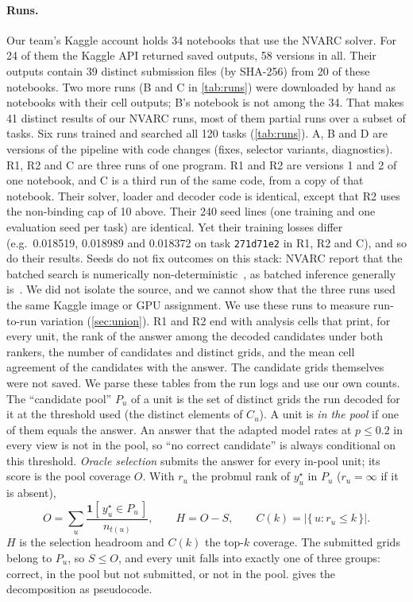 \documentclass[11pt]{article}
\newcommand{\code}[1]{\texttt{#1}}
\newcommand{\R}[1]{R#1}
\begin{document}
\paragraph{Runs.}
Our team's Kaggle account holds 34 notebooks that use the NVARC solver. For 24 of them the Kaggle API returned saved outputs, 58 versions in all. Their outputs contain 39 distinct submission files (by SHA-256) from 20 of these notebooks. Two more runs (B and C in \cref{tab:runs}) were downloaded by hand as notebooks with their cell outputs; B's notebook is not among the 34. That makes 41 distinct results of our NVARC runs, most of them partial runs over a subset of tasks.
Six runs trained and searched all 120 tasks (\cref{tab:runs}). A, B and D are versions of the pipeline with code changes (fixes, selector variants, diagnostics).
\R{1}, \R{2} and C are three runs of one program. \R{1} and \R{2} are versions 1 and 2 of one notebook, and C is a third run of the same code, from a copy of that notebook. Their solver, loader and decoder code is identical, except that \R{2} uses the non-binding cap of 10 above. Their 240 seed lines (one training and one evaluation seed per task) are identical. Yet their training losses differ (e.g.\ 0.018519, 0.018989 and 0.018372 on task \code{271d71e2} in \R{1}, \R{2} and C), and so do their results.
Seeds do not fix outcomes on this stack: NVARC report that the batched search is numerically non-deterministic~\citep{nvarc2025}, as batched inference generally is~\citep{he2025nondeterminism}. We did not isolate the source, and we cannot show that the three runs used the same Kaggle image or GPU assignment. We use these runs to measure run-to-run variation (\cref{sec:union}).
\R{1} and \R{2} end with analysis cells that print, for every unit, the rank of the answer among the decoded candidates under both rankers, the number of candidates and distinct grids, and the mean cell agreement of the candidates with the answer. The candidate grids themselves were not saved.
We parse these tables from the run logs and use our own counts. The ``candidate pool'' $P_u$ of a unit is the set of distinct grids the run decoded for it at the threshold used (the distinct elements of $C_u$). A unit is \emph{in the pool} if one of them equals the answer. An answer that the adapted model rates at $p \le 0.2$ in every view is not in the pool, so ``no correct candidate'' is always conditional on this threshold.
\emph{Oracle selection} submits the answer for every in-pool unit; its score is the pool coverage $O$. With $r_u$ the probmul rank of $y^\star_u$ in $P_u$ ($r_u=\infty$ if it is absent),
\begin{equation}
\label{eq:oracle}
O = \sum_{u} \frac{\mathbf{1}[\,y^\star_u \in P_u\,]}{n_{t(u)}}, \qquad
H = O - S, \qquad
C(k) = \big|\{\,u : r_u \le k\,\}\big| .
\end{equation}
$H$ is the selection headroom and $C(k)$ the top-$k$ coverage. The submitted grids belong to $P_u$, so $S \le O$, and every unit falls into exactly one of three groups: correct, in the pool but not submitted, or not in the pool.
 gives the decomposition as pseudocode.
\end{document}
